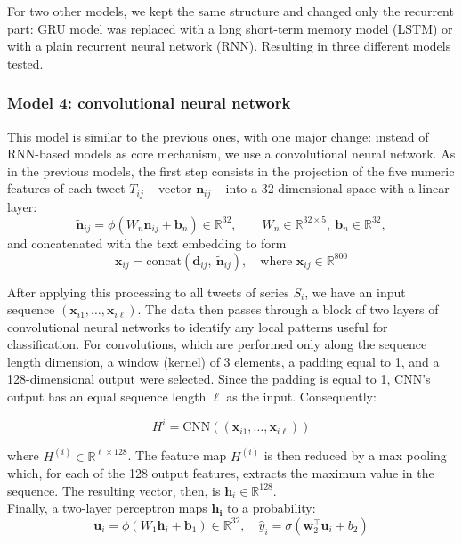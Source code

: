 \documentclass[a4paper,twoside,12pt]{book}
\begin{document}
For two other models, we kept the same structure and changed only the recurrent part: GRU model was replaced with a long short-term memory model (LSTM) or with a plain recurrent neural network (RNN). Resulting in three different models tested. 

\subsubsection*{Model 4: convolutional neural network}

This model is similar to the previous ones, with one major change: instead of RNN-based models as core mechanism, we use a convolutional neural network. As in the previous models, the first step consists in the projection of the five numeric features of each tweet $T_{ij}$ -- vector $\mathbf{n}_{ij}$ -- into a 32-dimensional space with a linear layer:
\[
\tilde{\mathbf{n}}_{ij}=\phi\!\left(W_n \mathbf{n}_{ij}+\mathbf{b}_n\right)\in\mathbb{R}^{32},\qquad
W_n\in\mathbb{R}^{32\times 5},\ \mathbf{b}_n\in\mathbb{R}^{32},
\]
and concatenated with the text embedding to form
\[
\mathbf{x}_{ij}=\text{concat}(\mathbf{d}_{ij},\ \tilde{\mathbf{n}}_{ij}), \quad \text{where } \mathbf{x}_{ij}\in\mathbb{R}^{800}
\]

After applying this processing to all tweets of series $S_i$, we have an input sequence $(\mathbf{x}_{i1}, \dots, \mathbf{x}_{i\ell})$. The data then passes through a block of two layers of convolutional neural networks to identify any local patterns useful for classification. For convolutions, which are performed only along the sequence length dimension, a window (kernel) of 3 elements, a padding equal to 1, and a 128-dimensional output were selected. Since the padding is equal to 1, CNN's output has an equal sequence length $\ell$ as the input.
Consequently:

\[
H^i = \text{CNN}((\mathbf{x}_{i1}, \dots, \mathbf{x}_{i\ell})) 
\]

where $H^{(i)} \in \mathbb{R}^{\ell\times128}$. The feature map $H^{(i)}$ is then reduced by a max pooling which, for each of the 128 output features, extracts the maximum value in the sequence. The resulting vector, then, is $\mathbf{h}_i \in \mathbb{R}^{128}$. \\
Finally, a two-layer perceptron maps $\mathbf{h_i}$ to a probability:
\[
\mathbf{u}_i=\phi(W_1\mathbf{h}_i+\mathbf{b}_1)\in\mathbb{R}^{32},\quad
\hat{y}_i=\sigma(\mathbf{w}_2^\top\mathbf{u}_i+b_2)
\]
\end{document}
